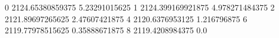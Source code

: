 0 2124.65380859375 5.23291015625
1 2124.399169921875 4.978271484375
2 2121.89697265625 2.47607421875
4 2120.6376953125 1.216796875
6 2119.77978515625 0.35888671875
8 2119.4208984375 0.0
